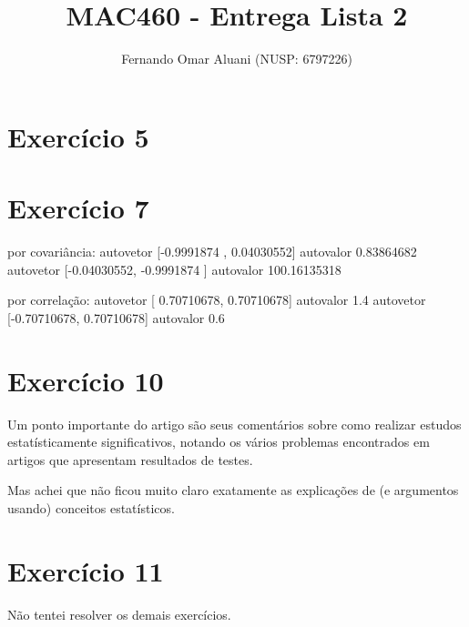 \documentclass[a4paper,11pt]{article}
\title{MAC460 - Entrega Lista 2}
\author{Fernando Omar Aluani (NUSP: 6797226)}
\begin{document}
\maketitle

\section{Exercício 5}

\section{Exercício 7}

por covariância:
autovetor [-0.9991874 ,  0.04030552] autovalor 0.83864682
autovetor [-0.04030552, -0.9991874 ] autovalor 100.16135318

por correlação:
autovetor [ 0.70710678,  0.70710678] autovalor 1.4
autovetor [-0.70710678,  0.70710678] autovalor 0.6

\section{Exercício 10}

Um ponto importante do artigo são seus comentários sobre como realizar estudos estatísticamente significativos,
notando os vários problemas encontrados em artigos que apresentam resultados de testes.

Mas achei que não ficou muito claro exatamente as explicações de (e argumentos usando) conceitos estatísticos. 


\section{Exercício 11}

Não tentei resolver os demais exercícios.
\end{document}
